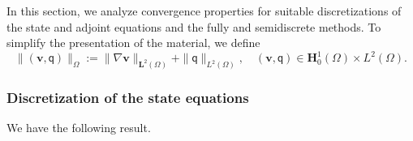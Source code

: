 \documentclass[final]{siamart0216}
\begin{document}
In this section, we analyze convergence properties for suitable discretizations of the state and adjoint equations and the fully and semidiscrete methods. To simplify the presentation of the material, we define
\begin{equation}
\label{eq:energy_norm}
 \| (\mathbf{v},\mathsf{q}) \|_{\Omega} := \|\nabla \mathbf{v} \|_{\mathbf{L}^2(\Omega)}+\|\mathsf{q}\|_{L^2(\Omega)},
 \quad
 (\mathbf{v},\mathsf{q}) \in \mathbf{H}_0^1(\Omega) \times L^2(\Omega).
\end{equation}

\subsubsection{Discretization of the state equations}
We have the following result.
\end{document}
